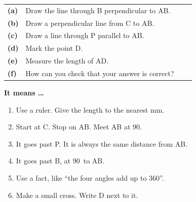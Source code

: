 \documentclass[12pt,a4paper]{article}
\newcommand{\nbox}{\ \fbox{\rule{0pt}{1.05em}\rule{1.0em}{0pt}}\ }
\newcommand{\fbx}[1]{\ \fbox{\makebox[1.0em]{\rule{0pt}{1.05em}\color{cbteal}\bfseries #1}}\ }
\begin{document}
\begin{minipage}{\textwidth}
\vspace{6pt}
\noindent\begin{minipage}[t]{0.585\textwidth}\vspace{0pt}\raggedright
  {\renewcommand{\arraystretch}{1.75}%
  \begin{tabular}{@{}l@{\ \ }P{7.1cm}@{\ }l@{}}
    \textbf{(a)} & Draw the line through B perpendicular to AB. & \fbx{4} \\
    \textbf{(b)} & Draw a perpendicular line from C to AB. & \nbox \\
    \textbf{(c)} & Draw a line through P parallel to AB. & \nbox \\
    \textbf{(d)} & Mark the point D. & \nbox \\
    \textbf{(e)} & Measure the length of AD. & \nbox \\
    \textbf{(f)} & How can you check that your answer is correct? & \nbox \\
  \end{tabular}}
\end{minipage}\hfill
\begin{minipage}[t]{0.395\textwidth}\vspace{0pt}
  \begin{tcolorbox}[enhanced, colback=white, colframe=rulegray, boxrule=0.6pt,
                    arc=5pt, left=8pt, right=8pt, top=6pt, bottom=6pt,
                    nobeforeafter]
    \raggedright{\bfseries It means \ldots}
    \begin{enumerate}[label=\textbf{\arabic*}, itemsep=5pt, topsep=4pt]
      \item Use a ruler. Give the length to the nearest mm.
      \item Start at C. Stop on AB. Meet AB at 90\textdegree.
      \item It goes past P. It is always the same distance from AB.
      \item It goes past B, at 90\textdegree\ to AB.
      \item Use a fact, like ``the four angles add up to 360\textdegree''.
      \item Make a small cross. Write D next to it.
    \end{enumerate}
  \end{tcolorbox}
\end{minipage}
\end{minipage}
\end{document}
